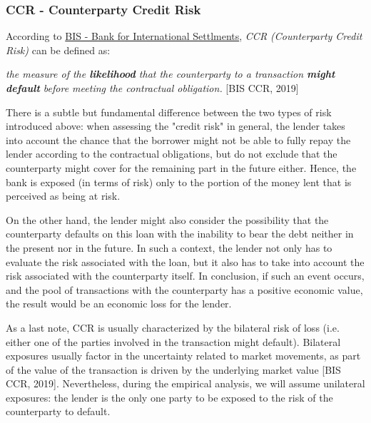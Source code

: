 \documentclass[a4paper,12pt]{article}
\begin{document}
    \subsubsection{CCR - Counterparty Credit Risk}

    According to \href{https://www.bis.org/}{BIS - Bank for International Settlments}, \textit{CCR (Counterparty Credit Risk)} can be defined as:
    
        \begin{definition} \textit{the measure of the \textbf{likelihood} that the counterparty to a transaction \textbf{might default} before meeting the contractual obligation.} [BIS CCR, 2019]
        \end{definition}

        There is a subtle but fundamental difference between the two types of risk introduced above: 
        when assessing the "credit risk" in general, the lender takes into account the chance that the 
        borrower might not be able to fully repay the lender according to the contractual obligations, 
        but do not exclude that the counterparty might cover for the remaining part in the future either. 
        Hence, the bank is exposed (in terms of risk) only to the portion of the money lent that is perceived as being at risk. 
        
        On the other hand, the lender might also consider the possibility that the counterparty defaults on this loan 
        with the inability to bear the debt neither in the present nor in the future. 
        In such a context, the lender not only has to evaluate the risk associated with the loan, 
        but it also has to take into account the risk associated with the counterparty itself. 
        In conclusion, if such an event occurs, and the pool of transactions with the counterparty has a positive economic value, 
        the result would be an economic loss for the lender. 

        As a last note, CCR is usually characterized by the bilateral risk of loss (i.e. either one of the parties involved in the transaction might default). 
        Bilateral exposures usually factor in the uncertainty related to market movements, as part of the value of the transaction is driven by the underlying market value [BIS CCR, 2019].
        Nevertheless, during the empirical analysis, we will assume unilateral exposures: 
        the lender is the only one party to be exposed to the risk of the counterparty to default.
\end{document}
